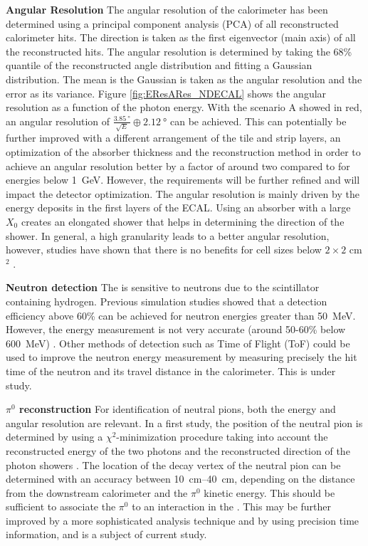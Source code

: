 \textbf{Angular Resolution} The angular resolution of the calorimeter has been determined using a principal component analysis (PCA) of all reconstructed calorimeter hits. The direction is taken as the first eigenvector (main axis) of all the reconstructed hits. The angular resolution is determined by taking the 68\% quantile of the reconstructed angle distribution and fitting a Gaussian distribution. The mean is the Gaussian is taken as the angular resolution and the error as its variance. Figure \ref{fig:EResARes_NDECAL} shows the angular resolution as a function of the photon energy. With the scenario A showed in red, an angular resolution of $\frac{\SI{3.85}{\degree}}{\sqrt{E}} \oplus \SI{2.12}{\degree}$ can be achieved. This can potentially be further improved with a different arrangement of the tile and strip layers, an optimization of the absorber thickness and the reconstruction method in order to achieve an angular resolution better by a factor of around two compared to  \cite{Abe:2011ks, Guzowski:2011duw} for energies below \SI{1}{\GeV}. However, the requirements will be further refined and will impact the detector optimization. The angular resolution is mainly driven by the energy deposits in the first layers of the ECAL. Using an absorber with a large $X_{0}$ creates an elongated shower that helps in determining the direction of the shower. In general, a high granularity leads to a better angular resolution, however, studies have shown that there is no benefits for cell sizes below $2\times2$ cm$^2$ \cite{Emberger:2018pgr}.



\textbf{Neutron detection} The  is sensitive to neutrons due to the scintillator containing hydrogen. Previous simulation studies showed that a detection efficiency above 60\% can be achieved for neutron energies greater than \SI{50}{\MeV}. However, the energy measurement is not very accurate (around 50-60\% below \SI{600}{\MeV}) \cite{Emberger:2018pgr}. Other methods of detection such as Time of Flight (ToF) could be used to improve the neutron energy measurement by measuring precisely the hit time of the neutron and its travel distance in the calorimeter.  This is under study.

\textbf{$\pi^0$ reconstruction} For identification of neutral pions, both the energy and angular resolution are relevant. In a first study, the position of the neutral pion is determined by using a $\chi^2$-minimization procedure taking into account the reconstructed energy of the two photons and the reconstructed direction of the photon showers \cite{Emberger:2018pgr}. The location of the decay vertex of the neutral pion can be determined with an accuracy between \SIrange{10}{40}{\cm}, depending on the distance from the downstream calorimeter and the $\pi^0$ kinetic energy. This should be sufficient  to associate the $\pi^0$ to an interaction in the . 
This may be further improved by a more sophisticated analysis technique and by using precision time information, and is a subject of current study.




